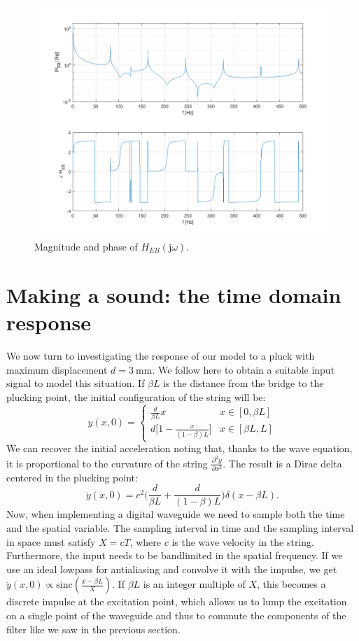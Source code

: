 \documentclass[a4paper]{article}
\begin{document}
\begin{figure}[h]
	\centering
	\includegraphics[width=0.75\linewidth]{heb.png}
	\caption{Magnitude and phase of $H_{EB}(\mathrm{j}\omega)$.}
	\label{fig:q2}
\end{figure}



\section{Making a sound: the time domain response}

We now turn to investigating the response of our model to a pluck with maximum displacement $d = \SI{3}{\milli\meter}$. We follow here \cite{smith92} to obtain a suitable input signal to model this situation. If $\beta L$ is the distance from the bridge to the plucking point, the initial configuration of the string will be:
$$ 
y(x, 0) = \left\{
	\begin{array}{lr}
		\frac{d}{\beta L}x & x \in [0, \beta L] \\[4pt]
		d \bigl[ 1 - \frac{x}{(1 - \beta) L} \bigr] & x \in [\beta L, L]
	\end{array}
\right.
$$
We can recover the initial acceleration noting that, thanks to the wave equation, it is proportional to the curvature of the string $\frac{\partial^2 y}{\partial x^2}$. The result is a Dirac delta centered in the plucking point:
$$
\ddot y(x, 0) = c^2 \biggl( \frac{d}{\beta L} + \frac{d}{(1 - \beta) L} \biggr) \delta(x - \beta L).
$$
Now, when implementing a digital waveguide we need to sample both the time and the spatial variable. The sampling interval in time and the sampling interval in space must satisfy $X = cT$, where $c$ is the wave velocity in the string. Furthermore, the input needs to be bandlimited in the spatial frequency. If we use an ideal lowpass for antialiasing and convolve it with the impulse, we get $\ddot y (x, 0) \propto \mathrm{sinc}\left( \frac{x-\beta L}{X} \right)$. If $\beta L$ is an integer multiple of $X$, this becomes a discrete impulse at the excitation point, which allows us to lump the excitation on a single point of the waveguide and thus to commute the components of the filter like we saw in the previous section.
\end{document}

